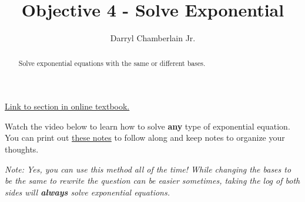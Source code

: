 \documentclass{ximera}
\author{Darryl Chamberlain Jr.}
\title{Objective 4 - Solve Exponential}
\begin{document}
\begin{abstract}
Solve exponential equations with the same or different bases.
\end{abstract}
\maketitle

\href{https://cnx.org/contents/mwjClAV_@8.1:wfhkHyEh@11/Exponential-and-Logarithmic-Equations}{Link to section in online textbook.}


Watch the video below to learn how to solve \textbf{any} type of exponential equation. You can print out \href{http://people.clas.ufl.edu/dchamberlain31/files/Objective-4-Solve-Exponential-Equalities.pdf}{these notes} to follow along and keep notes to organize your thoughts.  


\textit{Note: Yes, you can use this method all of the time! While changing the bases to be the same to rewrite the question can be easier sometimes, taking the log of both sides will \textbf{always} solve exponential equations.}
\end{document}
